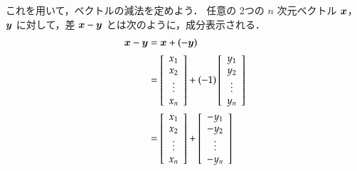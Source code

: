                 これを用いて，ベクトルの減法を定めよう．
                任意の 2つの $n$ 次元ベクトル $\boldsymbol{x}$，$\boldsymbol{y}$ に対して，差
                $\boldsymbol{x} - \boldsymbol{y}$ とは次のように，成分表示される．
                \begin{align}
                    \bx - \by &= \bx + (- \by) \notag \\
                    &=
                    \left[
                        \begin{array}{c}
                            x_{1}  \\
                            x_{2}  \\
                            \vdots \\
                            x_{n}  \\
                        \end{array}
                    \right]
                    +
                    (-1)\left[
                        \begin{array}{c}
                            y_{1}  \\
                            y_{2}  \\
                            \vdots \\
                            y_{n}  \\
                        \end{array}
                    \right] \notag \\
                    &=
                    \left[
                        \begin{array}{c}
                            x_{1}  \\
                            x_{2}  \\
                            \vdots \\
                            x_{n}  \\
                        \end{array}
                    \right]
                    +
                    \left[
                        \begin{array}{c}
                            -y_{1}  \\
                            -y_{2}  \\
                            \vdots \\
                            -y_{n}  \\
                        \end{array}
                    \right] \notag \\

\end{align}
